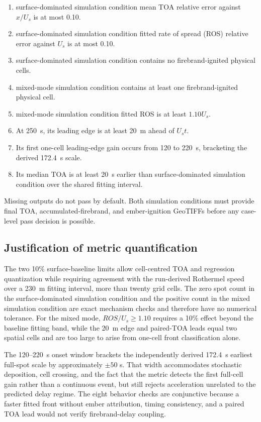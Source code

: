 \begin{enumerate}
\item surface-dominated simulation condition mean TOA relative error against $x/U_s$ is at most 0.10.
\item surface-dominated simulation condition fitted rate of spread (ROS) relative error against $U_s$ is at most 0.10.
\item surface-dominated simulation condition contains no firebrand-ignited physical cells.
\item mixed-mode simulation condition contains at least one firebrand-ignited physical cell.
\item mixed-mode simulation condition fitted ROS is at least $1.10U_s$.
\item At \SI{250}{\second}, its leading edge is at least \SI{20}{\metre}
      ahead of $U_s t$.
\item Its first one-cell leading-edge gain occurs from 120 to
      \SI{220}{\second}, bracketing the derived \SI{172.4}{\second} scale.
\item Its median TOA is at least \SI{20}{\second} earlier than surface-dominated simulation condition over
      the shared fitting interval.
\end{enumerate}

Missing outputs do not pass by default. Both simulation conditions must provide final TOA,
accumulated-firebrand, and ember-ignition GeoTIFFs before any case-level pass
decision is possible.

\subsection{Justification of metric quantification}

The two 10\% surface-baseline limits allow cell-centred TOA and regression
quantization while requiring agreement with the run-derived Rothermel speed
over a \SI{230}{m} fitting interval, more than twenty grid cells.  The zero
spot count in the surface-dominated simulation condition and the positive count in the
mixed simulation condition are exact mechanism checks and therefore have no numerical
tolerance.  For the mixed mode, \(ROS/U_s\ge1.10\) requires a 10\% effect
beyond the baseline fitting band, while the \SI{20}{m} edge and paired-TOA
leads equal two spatial cells and are too large to arise from one-cell front
classification alone.

The 120--\SI{220}{s} onset window brackets the independently derived
\SI{172.4}{s} earliest full-spot scale by approximately \(\pm50\) s.  That
width accommodates stochastic deposition, cell crossing, and the fact that
the metric detects the first full-cell gain rather than a continuous event,
but still rejects acceleration unrelated to the predicted delay regime.  The
eight behavior checks are conjunctive because a faster fitted front without
ember attribution, timing consistency, and a paired TOA lead would not verify
firebrand-delay coupling.

